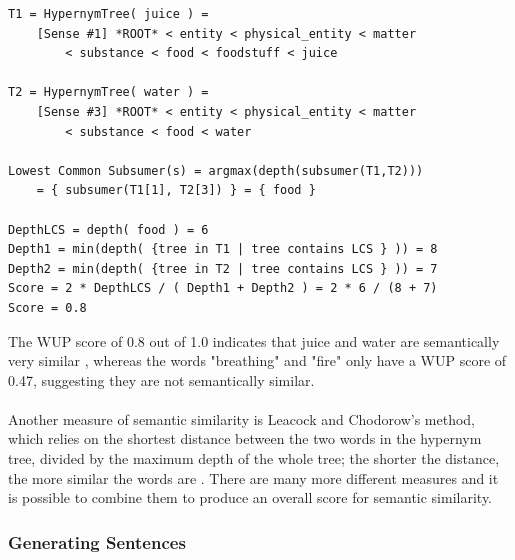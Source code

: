 \documentclass[11pt]{article}
\begin{document}
\begin{lstlisting}[frame=single]
T1 = HypernymTree( juice ) =
    [Sense #1] *ROOT* < entity < physical_entity < matter
    	< substance < food < foodstuff < juice

T2 = HypernymTree( water ) =
    [Sense #3] *ROOT* < entity < physical_entity < matter
    	< substance < food < water

Lowest Common Subsumer(s) = argmax(depth(subsumer(T1,T2)))
    = { subsumer(T1[1], T2[3]) } = { food }

DepthLCS = depth( food ) = 6
Depth1 = min(depth( {tree in T1 | tree contains LCS } )) = 8
Depth2 = min(depth( {tree in T2 | tree contains LCS } )) = 7
Score = 2 * DepthLCS / ( Depth1 + Depth2 ) = 2 * 6 / (8 + 7)
Score = 0.8
\end{lstlisting}

The WUP score of 0.8 out of 1.0 indicates that juice and water are semantically very similar \cite{RefWorks:47}, whereas the words "breathing" and "fire" only have a WUP score of 0.47, suggesting they are not semantically similar.
\\
\\
Another measure of semantic similarity is Leacock and Chodorow's method, which relies on the shortest distance between the two words in the hypernym tree, divided by the maximum depth of the whole tree; the shorter the distance, the more similar the words are \cite{RefWorks:46}. There are many more different measures and it is possible to combine them to produce an overall score for semantic similarity.

\subsubsection{Generating Sentences}
\end{document}
